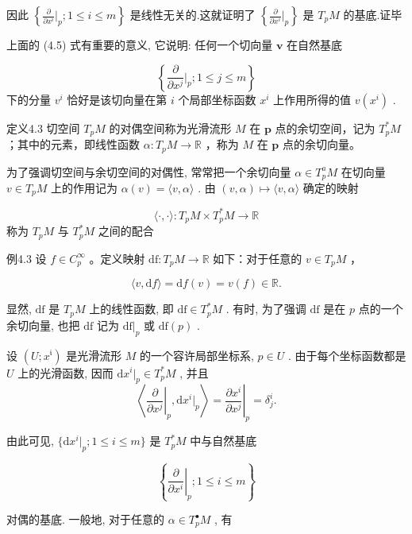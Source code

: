 因此  $\left\{\frac{\partial}{\partial x^i}\bigg|_p;1\leqslant i\leqslant m\right\}$  是线性无关的.这就证明了  $\left\{\frac{\partial}{\partial x^i}\bigg|_p\right\}$  是 $T_{p}M$  的基底.证毕

上面的 (4.5) 式有重要的意义, 它说明: 任何一个切向量  $\pmb{v}$  在自然基底

$$
\left\{\frac {\partial}{\partial x ^ {j}} \Big | _ {p}; 1 \leqslant j \leqslant m \right\}
$$
下的分量  $v^i$  恰好是该切向量在第  $i$  个局部坐标函数  $x^i$  上作用所得的值  $v(x^i)$ .

定义4.3 切空间  $T_{p}M$  的对偶空间称为光滑流形  $M$  在  $\pmb{p}$  点的余切空间，记为  $T_{p}^{*}M$ ；其中的元素，即线性函数  $\alpha : T_{p}M \to \mathbb{R}$ ，称为  $M$  在  $\pmb{p}$  点的余切向量。

为了强调切空间与余切空间的对偶性, 常常把一个余切向量  $\alpha \in T_{p}^{a}M$  在切向量  $v \in T_{p}M$  上的作用记为  $\alpha(v) = \langle v, \alpha \rangle$ . 由  $(v, \alpha) \mapsto \langle v, \alpha \rangle$  确定的映射

$$
\langle \cdot , \cdot \rangle : T _ {p} M \times T _ {p} ^ {*} M \rightarrow \mathbb {R}
$$
称为  $T_{p}M$  与  $T_{p}^{*}M$  之间的配合

例4.3 设  $f \in C_p^\infty$ 。定义映射  $\mathrm{df}: T_pM \to \mathbb{R}$  如下：对于任意的  $v \in T_pM$ ，

$$
\langle v, \mathrm {d} f \rangle = \mathrm {d} f (v) = v (f) \in \mathbb {R}.
$$

显然,  $\mathrm{df}$  是  $T_{p}M$  上的线性函数, 即  $\mathrm{df} \in T_{p}^{*}M$ . 有时, 为了强调  $\mathrm{df}$  是在  $p$  点的一个余切向量, 也把  $\mathrm{df}$  记为  $\mathrm{df}|_{p}$  或  $\mathrm{df}(p)$ .

设  $(U; x^{\mathfrak{i}})$  是光滑流形  $M$  的一个容许局部坐标系,  $p \in U$ . 由于每个坐标函数都是  $U$  上的光滑函数, 因而  $\mathrm{d}x^{i}|_{p} \in T_{p}^{*}M$ , 并且
$$
\left\langle \left. \frac {\partial}{\partial x ^ {j}} \right| _ {p}, \mathrm {d} x ^ {i} | _ {p} \right\rangle = \left. \frac {\partial x ^ {i}}{\partial x ^ {j}} \right| _ {p} = \delta_ {j} ^ {i}.
$$

由此可见,  $\{\mathrm{d}x^i|_p; 1 \leqslant i \leqslant m\}$  是  $T_p^*M$  中与自然基底

$$
\left\{\left. \frac {\partial}{\partial x ^ {i}} \right| _ {p}; 1 \leqslant i \leqslant m \right\}
$$

对偶的基底. 一般地, 对于任意的  $\alpha \in T_{p}^{\bullet}M$ , 有

